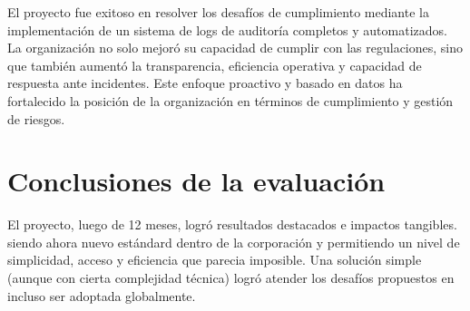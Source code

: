 El proyecto fue exitoso en resolver los desafíos de cumplimiento mediante la implementación de un sistema de logs de auditoría completos y automatizados. La organización no solo mejoró su capacidad de cumplir con las regulaciones, sino que también aumentó la transparencia, eficiencia operativa y capacidad de respuesta ante incidentes. Este enfoque proactivo y basado en datos ha fortalecido la posición de la organización en términos de cumplimiento y gestión de riesgos.

\section{Conclusiones de la evaluación}

El proyecto, luego de 12 meses, logró resultados destacados e impactos tangibles. siendo ahora nuevo estándard dentro de la corporación y permitiendo un nivel de simplicidad, acceso y eficiencia que parecia imposible. Una solución simple (aunque con cierta complejidad técnica) logró atender los desafíos propuestos en incluso ser adoptada globalmente.

